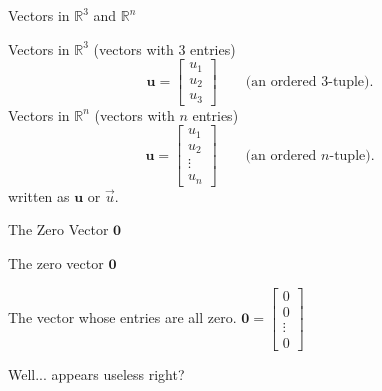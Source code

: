 \begin{frame}{Vectors in $\mathbb{R}^3$ and $\mathbb{R}^n$}

{\color{blue}Vectors in $\mathbb{R}^3$ (vectors with 3 entries)}
  \[
    \mathbf{u}=\begin{bmatrix}u_1\\u_2\\u_3\end{bmatrix}
    \qquad\text{(an ordered $3$-tuple).}
  \]
{\color{blue}Vectors in $\mathbb{R}^n$ (vectors with $n$ entries)}
  \[
    \mathbf{u}=\begin{bmatrix}u_1\\u_2\\\vdots\\u_n\end{bmatrix}
    \qquad\text{(an ordered $n$-tuple).}
  \]
  written as $\mathbf{u}$ or $\vec{u}$.
\end{frame}

\begin{frame}{The Zero Vector $\mathbf{0}$}

    {The \color{blue} zero vector $\mathbf{0}$}

  The vector whose entries are all zero.
  $\mathbf{0} = \begin{bmatrix}0\\0\\\vdots\\0\end{bmatrix}$\pause

  Well... appears useless right?
  
\end{frame}

